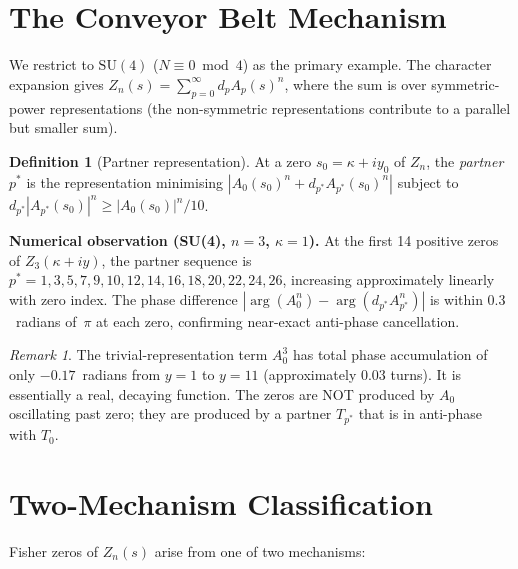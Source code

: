 \documentclass[12pt]{article}
\theoremstyle{definition}
\newtheorem{definition}[theorem]{Definition}
\theoremstyle{remark}
\newtheorem{remark}[theorem]{Remark}
\newcommand{\SU}{\mathrm{SU}}
\begin{document}
\section{The Conveyor Belt Mechanism}\label{sec:conveyor}

We restrict to $\SU(4)$ ($N \equiv 0 \bmod 4$) as the primary example.
The character expansion gives $Z_n(s) = \sum_{p=0}^\infty d_p A_p(s)^n$,
where the sum is over symmetric-power representations (the non-symmetric
representations contribute to a parallel but smaller sum).

\begin{definition}[Partner representation]
At a zero $s_0 = \kappa + iy_0$ of $Z_n$, the \emph{partner} $p^*$ is
the representation minimising $|A_0(s_0)^n + d_{p^*} A_{p^*}(s_0)^n|$
subject to $d_{p^*} |A_{p^*}(s_0)|^n \geq |A_0(s_0)|^n / 10$.
\end{definition}

\noindent
\textbf{Numerical observation (SU(4), $n = 3$, $\kappa = 1$).}
At the first 14 positive zeros of $Z_3(\kappa + iy)$, the partner
sequence is $p^* = 1, 3, 5, 7, 9, 10, 12, 14, 16, 18, 20, 22, 24, 26$,
increasing approximately linearly with zero index. The phase difference
$|\arg(A_0^n) - \arg(d_{p^*} A_{p^*}^n)|$ is within $0.3$~radians of~$\pi$
at each zero, confirming near-exact anti-phase cancellation.

\begin{remark}
The trivial-representation term $A_0^3$ has total phase accumulation of
only $-0.17$~radians from $y = 1$ to $y = 11$ (approximately $0.03$ turns).
It is essentially a real, decaying function. The zeros are NOT produced by
$A_0$ oscillating past zero; they are produced by a partner $T_{p^*}$
that is in anti-phase with $T_0$.
\end{remark}


\section{Two-Mechanism Classification}\label{sec:two-mech}

Fisher zeros of $Z_n(s)$ arise from one of two mechanisms:
\end{document}
